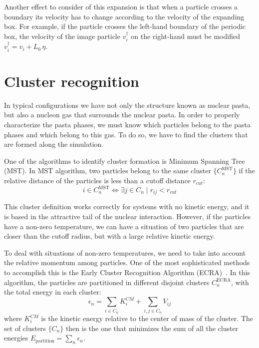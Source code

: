 Another effect to consider of this expansion is that when a particle
crosses a boundary its velocity has to change according to the
velocity of the expanding box. For example, if the particle crosses
the left-hand boundary of the periodic box, the velocity of the image
particle $v_i^\dagger$ on the right-hand must be modified $v_i^\dagger
= v_i + L_0\,\eta$.

\section{Cluster recognition}\label{sc:cluster}
In typical configurations we have not only the structure known as
nuclear pasta, but also a nucleon gas that surrounds the nuclear
pasta. In order to properly characterize the pasta phases, we must
know which particles belong to the pasta phases and which belong to
this gas. To do so, we have to find the clusters that are formed along
the simulation.

One of the algorithms to identify cluster formation is Minimum
Spanning Tree (MST). In MST algorithm, two particles belong to the
same cluster $\{C^{\text{MST}}_n\}$ if the relative distance of the
particles is less than a cutoff distance $r_{cut}$:
\begin{equation*}
  i \in C^{\text{MST}}_n \Leftrightarrow \exists j \in C_n \mid
  r_{ij} < r_{cut}
\end{equation*}

This cluster definition works correctly for systems with no kinetic
energy, and it is based in the attractive tail of the nuclear
interaction. However, if the particles have a non-zero temperature, we
can have a situation of two particles that are closer than the cutoff
radius, but with a large relative kinetic energy.

To deal with situations of non-zero temperatures, we need to take into
account the relative momentum among particles. One of the most
sophisticated methods to accomplish this is the Early Cluster
Recognition Algorithm (ECRA)~\cite{dorso_early_1993}. In this
algorithm, the particles are partitioned in different disjoint
clusters $C^{\text{ECRA}}_n$, with the total energy in each cluster:
\begin{equation*}
  \epsilon_n = \sum_{i \in C_n} K^{CM}_i +  \sum_{i,j \in C_n} V_{ij}
\end{equation*}
where $K^{CM}_i$ is the kinetic energy relative to the center of mass
of the cluster. The set of clusters $\{C_n\}$ then is the one that
minimizes the sum of all the cluster energies $E_{\text{partition}} =
\sum_n \epsilon_n$.

